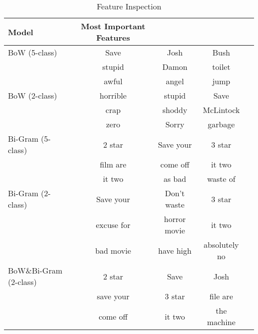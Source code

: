 \documentclass[12pt]{article}
\begin{document}
\begin{table*}[!htbp]
\centering
\caption{Feature Inspection}\label{feature}
\begin{tabular}{lcccc}
\hline
\hline
Model& Most Important Features\\
 \hline
BoW (5-class)&Save&Josh&Bush\\
&stupid&Damon&toilet\\
&awful&angel&jump&\\
BoW (2-class)&horrible&stupid&Save\\
&crap& shoddy&McLintock\\
&zero&Sorry&garbage\\
Bi-Gram (5-class)&2 star&Save your&3 star\\
&film are&come off&it two\\
&it two&as bad&waste of\\
Bi-Gram (2-class)&Save your&Don't waste&3 star\\
&excuse for&horror movie&it two\\
&bad movie&have high&absolutely no\\
BoW\&Bi-Gram (2-class)&2 star&Save&Josh\\
&save your&3 star&file are\\
&come off&it two&the machine\\
\hline
\hline
\end{tabular}
\end{table*}
\end{document}
